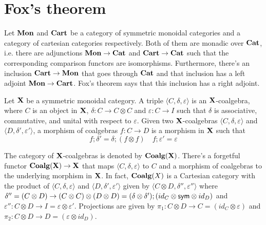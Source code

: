 \documentclass[acmsmall,screen, nonacm, anonymous]{acmart}
\begin{document}
\section{Fox's theorem}

Let $\mathbf{Mon}$ and $\mathbf{Cart}$ be a category of symmetric monoidal categories and a category of cartesian categories respectively.
Both of them are monadic over $\mathbf{Cat}$, i.e. there are adjunctions $\mathbf{Mon} \to \mathbf{Cat}$ and $\mathbf{Cart} \to \mathbf{Cat}$ such that the corresponding comparison functors are isomorphisms.
Furthermore, there's an inclusion $\mathbf{Cart} \to \mathbf{Mon}$ that goes through $\mathbf{Cat}$ and that inclusion has a left adjoint $\mathbf{Mon} \to \mathbf{Cart}$.
Fox's theorem says that this inclusion has a right adjoint.

Let $\mathbf{X}$ be a symmetric monoidal category.
A triple $\langle C, \delta, \varepsilon \rangle$ is an $\mathbf{X}$-coalgebra, where $C$ is an object in $\mathbf{X}$, $\delta : C \to C \otimes C$ and $\varepsilon : C \to I$ such that $\delta$ is associative, commutative, and unital with respect to $\varepsilon$.
Given two $\mathbf{X}$-coalgebras $\langle C, \delta, \varepsilon \rangle$ and $\langle D, \delta', \varepsilon' \rangle$, a morphism of coalgebras $f : C \to D$ is a morphism in $\mathbf{X}$ such that 
\[
f;\delta' = \delta; (f \otimes f) \quad f;\varepsilon' = \varepsilon
\]

The category of $\mathbf{X}$-coalgebras is denoted by $\mathbf{Coalg}(\mathbf{X})$.
There's a forgetful functor $\mathbf{Coalg}(\mathbf{X}) \to \mathbf{X}$ that maps $\langle C, \delta, \varepsilon \rangle$ to $C$ and a morphism of coalgebras to the underlying morphism in $\mathbf{X}$.
In fact, $\mathbf{Coalg}(X)$ is a Cartesian category with the product of $\langle C, \delta, \varepsilon \rangle$ and $\langle D, \delta', \varepsilon' \rangle$ given by $\langle C \otimes D, \delta'', \varepsilon'' \rangle$ where $\delta'' = (C \otimes D) \to (C \otimes C) \otimes (D \otimes D) = (\delta \otimes \delta');(id_{C} \otimes \textsf{sym} \otimes id_{D}) $ and $\varepsilon'' : C \otimes D \to I = \varepsilon \otimes \varepsilon'$.
Projections are given by $\pi_{1} : C \otimes D \to C = (id_{C} \otimes \varepsilon)$ and $\pi_{2} : C \otimes D \to D = (\varepsilon \otimes id_{D})$.



\end{document}

